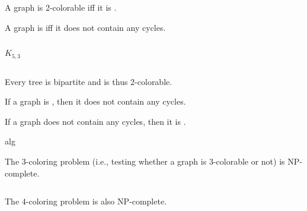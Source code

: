 \begin{frame}{}
  \begin{theorem}
    A graph is 2-colorable iff it is .

    \pause
    \vspace{0.30cm}
    A graph is  iff it does not contain any  cycles.
  \end{theorem}

  \begin{columns}
      \pause
      \[
        K_{5, 3}
      \]
      \pause
  \end{columns}

  \pause
  \begin{lemma}
    Every tree is bipartite and is thus $2$-colorable.
  \end{lemma}
\end{frame}

\begin{frame}{}
  \begin{Lemma}
    If a graph is ,
    then it does not contain any  cycles.
  \end{Lemma}
\end{frame}

\begin{frame}{}
  \begin{Lemma}
    If a graph does not contain any  cycles,
    then it is .
  \end{Lemma}
\end{frame}

\begin{frame}{}
alg
\end{frame}

\begin{frame}{}
  \begin{theorem}{}
    The $3$-coloring problem (i.e., testing whether a graph is $3$-colorable or not)
    is \textsf{NP-complete}.
  \end{theorem}

  \pause
  \begin{columns}
  \end{columns}

  \pause
  \begin{theorem}{}
    The $4$-coloring problem is also \textsf{NP-complete}.
  \end{theorem}
\end{frame}

